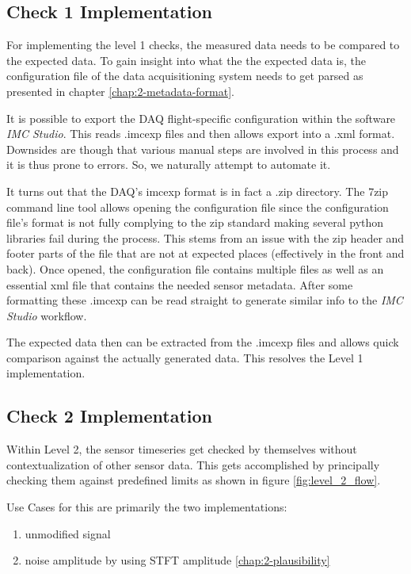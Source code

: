 \subsection{Check 1 Implementation}
For implementing the level 1 checks, the measured data needs to be compared to the expected data. To gain insight into what the the expected data is, the configuration file of the data acquisitioning system needs to get parsed as presented in chapter \ref{chap:2-metadata-format}.

It is possible to export the DAQ flight-specific configuration within the software \textit{IMC Studio}. This reads .imcexp files and then allows export into a .xml format. Downsides are though that various manual steps are involved in this process and it is thus prone to errors. So, we naturally attempt to automate it.

It turns out that the DAQ's imcexp format is in fact a .zip directory. The 7zip command line tool allows opening the configuration file since the configuration file's format is not fully complying to the zip standard making several python libraries fail during the process. This stems from an issue with the zip header and footer parts of the file that are not at expected places (effectively in the front and back). Once opened, the configuration file contains multiple files as well as an essential xml file that contains the needed sensor metadata. After some formatting these .imcexp can be read straight to generate similar info to the \textit{IMC Studio} workflow.

The expected data then can be extracted from the .imcexp files and allows quick comparison against the actually generated data. This resolves the Level 1 implementation.

\subsection{Check 2 Implementation}

Within Level 2, the sensor timeseries get checked by themselves without contextualization of other sensor data. This gets accomplished by principally checking them against predefined limits as shown in figure \ref{fig:level_2_flow}.

Use Cases for this are primarily the two implementations:

\begin{enumerate}
    \item unmodified signal
    \item noise amplitude by using STFT amplitude \ref{chap:2-plausibility}
\end{enumerate}

